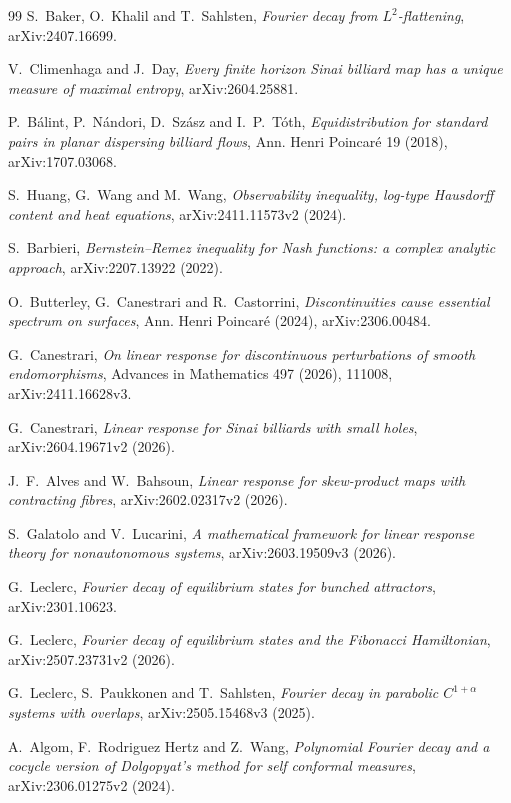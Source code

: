 \documentclass[11pt]{article}
\begin{document}
\begin{thebibliography}{99}
S.~Baker, O.~Khalil and T.~Sahlsten,
\emph{Fourier decay from $L^2$-flattening},
arXiv:2407.16699.

V.~Climenhaga and J.~Day,
\emph{Every finite horizon Sinai billiard map has a unique measure of maximal entropy},
arXiv:2604.25881.

P.~B\'alint, P.~N\'andori, D.~Sz\'asz and I.~P.~T\'oth,
\emph{Equidistribution for standard pairs in planar dispersing billiard flows},
Ann. Henri Poincar\'e 19 (2018), arXiv:1707.03068.

S.~Huang, G.~Wang and M.~Wang,
\emph{Observability inequality, log-type Hausdorff content and heat equations},
arXiv:2411.11573v2 (2024).

S.~Barbieri,
\emph{Bernstein--Remez inequality for Nash functions: a complex analytic
approach}, arXiv:2207.13922 (2022).

O.~Butterley, G.~Canestrari and R.~Castorrini,
\emph{Discontinuities cause essential spectrum on surfaces},
Ann. Henri Poincar\'e (2024), arXiv:2306.00484.

G.~Canestrari,
\emph{On linear response for discontinuous perturbations of smooth
endomorphisms}, Advances in Mathematics 497 (2026), 111008,
arXiv:2411.16628v3.

G.~Canestrari,
\emph{Linear response for Sinai billiards with small holes},
arXiv:2604.19671v2 (2026).

J.~F.~Alves and W.~Bahsoun,
\emph{Linear response for skew-product maps with contracting fibres},
arXiv:2602.02317v2 (2026).

S.~Galatolo and V.~Lucarini,
\emph{A mathematical framework for linear response theory for nonautonomous
systems}, arXiv:2603.19509v3 (2026).

G.~Leclerc,
\emph{Fourier decay of equilibrium states for bunched attractors},
arXiv:2301.10623.

G.~Leclerc,
\emph{Fourier decay of equilibrium states and the Fibonacci Hamiltonian},
arXiv:2507.23731v2 (2026).

G.~Leclerc, S.~Paukkonen and T.~Sahlsten,
\emph{Fourier decay in parabolic $C^{1+\alpha}$ systems with overlaps},
arXiv:2505.15468v3 (2025).

A.~Algom, F.~Rodriguez Hertz and Z.~Wang,
\emph{Polynomial Fourier decay and a cocycle version of Dolgopyat's method
for self conformal measures}, arXiv:2306.01275v2 (2024).


\end{thebibliography}
\end{document}
